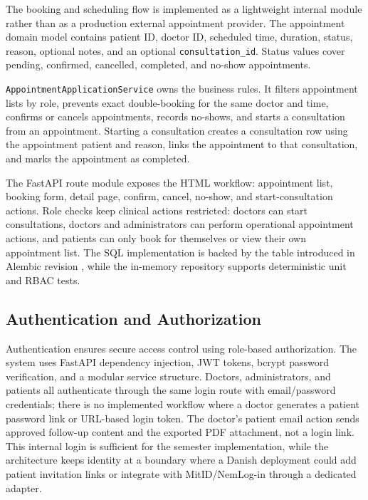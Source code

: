 The booking and scheduling flow is implemented as a lightweight internal module rather than as a production external appointment provider. The appointment domain model contains patient ID, doctor ID, scheduled time, duration, status, reason, optional notes, and an optional \texttt{consultation\_id}. Status values cover pending, confirmed, cancelled, completed, and no-show appointments.

\texttt{AppointmentApplicationService} owns the business rules. It filters appointment lists by role, prevents exact double-booking for the same doctor and time, confirms or cancels appointments, records no-shows, and starts a consultation from an appointment. Starting a consultation creates a consultation row using the appointment patient and reason, links the appointment to that consultation, and marks the appointment as completed.

The FastAPI route module  exposes the HTML workflow: appointment list, booking form, detail page, confirm, cancel, no-show, and start-consultation actions. Role checks keep clinical actions restricted: doctors can start consultations, doctors and administrators can perform operational appointment actions, and patients can only book for themselves or view their own appointment list. The SQL implementation is backed by the  table introduced in Alembic revision , while the in-memory repository supports deterministic unit and RBAC tests.

\subsection{Authentication and Authorization}
\label{subsec:authentication-authorization}

Authentication ensures secure access control using role-based authorization. The system uses FastAPI dependency injection, JWT tokens, bcrypt password verification, and a modular service structure. Doctors, administrators, and patients all authenticate through the same login route with email/password credentials; there is no implemented workflow where a doctor generates a patient password link or URL-based login token. The doctor's patient email action sends approved follow-up content and the exported PDF attachment, not a login link. This internal login is sufficient for the semester implementation, while the architecture keeps identity at a boundary where a Danish deployment could add patient invitation links or integrate with MitID/NemLog-in through a dedicated adapter.


